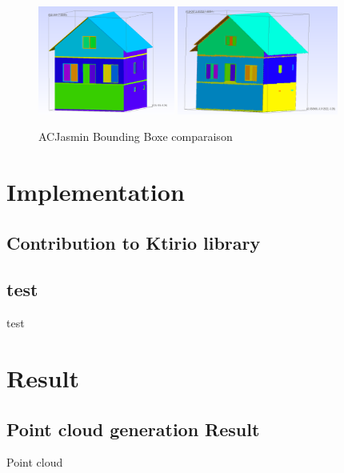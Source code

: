\documentclass[10pt]{beamer}
\begin{document}
\begin{frame}
    
    \begin{figure}
    \includegraphics[width=0.4\textwidth]{../image/ACJasmin_input_bounding_box.png}
    \includegraphics[width=0.47\textwidth]{../image/ACjasmin_output_bounding_box.png}
    \caption{ACJasmin Bounding Boxe comparaison}
    \end{figure}
    
\end{frame}

\section{Implementation}
\subsection{Contribution to Ktirio library}
\begin{frame}
    
\end{frame}

\subsection{test}
\begin{frame}{test}
\end{frame}

\section{Result}
\subsection{Point cloud generation Result}
\begin{frame}{Point cloud}
    
\end{frame}
\end{document}

